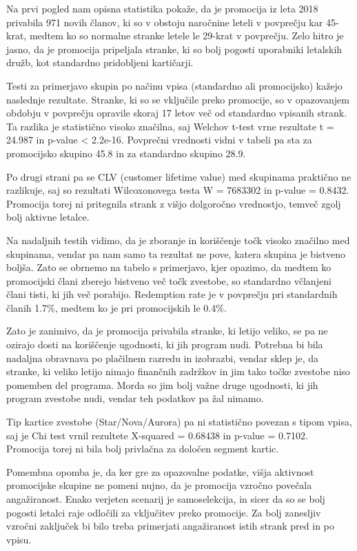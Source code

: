 \documentclass[
]{article}
\begin{document}
Na prvi pogled nam opisna statistika pokaže, da je promocija iz leta
2018 privabila 971 novih članov, ki so v obstoju naročnine leteli v
povprečju kar 45-krat, medtem ko so normalne stranke letele le 29-krat v
povprečju. Zelo hitro je jasno, da je promocija pripeljala stranke, ki
so bolj pogosti uporabniki letalskih družb, kot standardno pridobljeni
kartičarji.

Testi za primerjavo skupin po načinu vpisa (standardno ali promocijsko)
kažejo naslednje rezultate. Stranke, ki so se vključile preko promocije,
so v opazovanjem obdobju v povprečju opravile skoraj 17 letov več od
standardno vpisanih strank. Ta razlika je statistično visoko značilna,
saj Welchov t-test vrne rezultate t = 24.987 in p-value \textless{}
2.2e-16. Povprečni vrednosti vidni v tabeli pa sta za promocijsko
skupino 45.8 in za standardno skupino 28.9.

Po drugi strani pa se CLV (customer lifetime value) med skupinama
praktično ne razlikuje, saj so rezultati Wilcoxonovega testa W = 7683302
in p-value = 0.8432. Promocija torej ni pritegnila strank z višjo
dolgoročno vrednostjo, temveč zgolj bolj aktivne letalce.

Na nadaljnih testih vidimo, da je zboranje in koriščenje točk visoko
značilno med skupinama, vendar pa nam samo ta rezultat ne pove, katera
skupina je bistveno boljša. Zato se obrnemo na tabelo s primerjavo, kjer
opazimo, da medtem ko promocijski člani zberejo bistveno več točk
zvestobe, so standardno včlanjeni člani tisti, ki jih več porabijo.
Redemption rate je v povprečju pri standardnih članih 1.7\%, medtem ko
je pri promocijskih le 0.4\%.

Zato je zanimivo, da je promocija privabila stranke, ki letijo veliko,
se pa ne ozirajo dosti na koriščenje ugodnosti, ki jih program nudi.
Potrebna bi bila nadaljna obravnava po plačilnem razredu in izobrazbi,
vendar sklep je, da stranke, ki veliko letijo nimajo finančnih zadržkov
in jim tako točke zvestobe niso pomemben del programa. Morda so jim bolj
važne druge ugodnosti, ki jih program zvestobe nudi, vendar teh podatkov
pa žal nimamo.

Tip kartice zvestobe (Star/Nova/Aurora) pa ni statistično povezan s
tipom vpisa, saj je Chi test vrnil rezultete X-squared = 0.68438 in
p-value = 0.7102. Promocija torej ni bila bolj privlačna za določen
segment kartic.

Pomembna opomba je, da ker gre za opazovalne podatke, višja aktivnost
promocijske skupine ne pomeni nujno, da je promocija vzročno povečala
angažiranost. Enako verjeten scenarij je samoselekcija, in sicer da so
se bolj pogosti letalci raje odločili za vključitev preko promocije. Za
bolj zanesljiv vzročni zaključek bi bilo treba primerjati angažiranost
istih strank pred in po vpisu.
\end{document}
